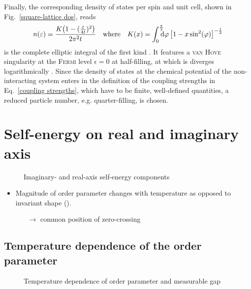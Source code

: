 Finally, the corresponding density of states per spin and unit cell, shown in
Fig.~\ref{square-lattice dos}, reads
%
\begin{equation*}
	n(\epsilon) = \frac{K \big(1 - (\tfrac \epsilon {4 t})^2 \big)}{2 \pi^2 t}
    \quad \text{where} \quad
    K(x) = \int \from 0 \till{\frac \pi 2} \D \varphi \,
    \big[ 1 - x \sin^2(\varphi) \big]^{-\frac 1 2}
\end{equation*}
%
is the complete elliptic integral of the first kind \cite[Eq.~4.146 and
4.147]{Czycholl08}. It features a \textsc{van Hove} singularity at the
\textsc{Fermi} level $\epsilon = 0$ at half-filling, at which is diverges
logarithmically \cite[Eq.~7]{Szczesniak06}. Since the density of states at the
chemical potential of the non-interacting system enters in the definition of the
coupling strengths in Eq.~\ref{coupling strengths}, which have to be finite,
well-defined quantities, a reduced particle number, e.g. quarter-filling, is
chosen.

\section{Self-energy on real and imaginary axis}

\begin{figure}
    \small
	
	
	
	
	
	
	\caption{Imaginary- and real-axis self-energy components}
\end{figure}

\begin{itemize}
    \item Magnitude of order parameter changes with temperature as opposed to
          invariant shape ().
    \begin{itemize}
        \item[$\rightarrow$] common position of zero-crossing
    \end{itemize}
\end{itemize}

\subsection{Temperature dependence of the order parameter}

\begin{figure}
    \small
    \centering
    
    \caption{Temperature dependence of order parameter and measurable gap}
\end{figure}

